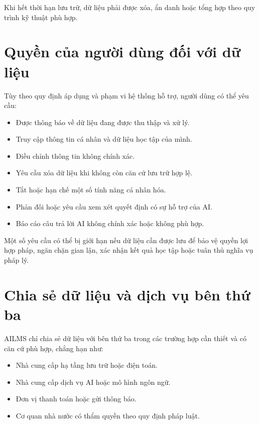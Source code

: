 \documentclass[12pt,a4paper]{article}
\begin{document}
Khi hết thời hạn lưu trữ, dữ liệu phải được xóa, ẩn danh hoặc tổng hợp
theo quy trình kỹ thuật phù hợp.

\section{Quyền của người dùng đối với dữ liệu}

Tùy theo quy định áp dụng và phạm vi hệ thống hỗ trợ, người dùng có thể yêu cầu:

\begin{itemize}
    \item Được thông báo về dữ liệu đang được thu thập và xử lý.
    \item Truy cập thông tin cá nhân và dữ liệu học tập của mình.
    \item Điều chỉnh thông tin không chính xác.
    \item Yêu cầu xóa dữ liệu khi không còn căn cứ lưu trữ hợp lệ.
    \item Tắt hoặc hạn chế một số tính năng cá nhân hóa.
    \item Phản đối hoặc yêu cầu xem xét quyết định có sự hỗ trợ của AI.
    \item Báo cáo câu trả lời AI không chính xác hoặc không phù hợp.
\end{itemize}

Một số yêu cầu có thể bị giới hạn nếu dữ liệu cần được lưu để bảo vệ quyền lợi hợp pháp,
ngăn chặn gian lận, xác nhận kết quả học tập hoặc tuân thủ nghĩa vụ pháp lý.

\section{Chia sẻ dữ liệu và dịch vụ bên thứ ba}

AILMS chỉ chia sẻ dữ liệu với bên thứ ba trong các trường hợp cần thiết và có căn cứ phù hợp,
chẳng hạn như:

\begin{itemize}
    \item Nhà cung cấp hạ tầng lưu trữ hoặc điện toán.
    \item Nhà cung cấp dịch vụ AI hoặc mô hình ngôn ngữ.
    \item Đơn vị thanh toán hoặc gửi thông báo.
    \item Cơ quan nhà nước có thẩm quyền theo quy định pháp luật.
\end{itemize}
\end{document}
